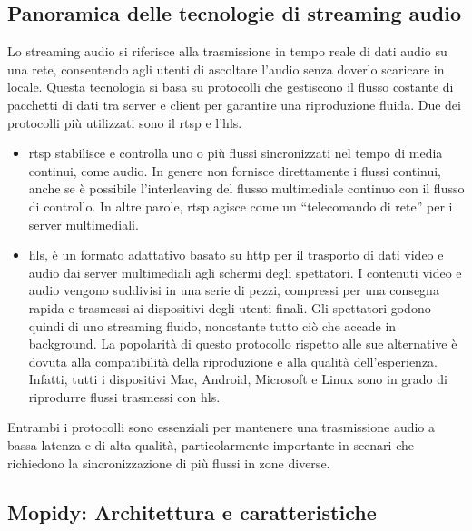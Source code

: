 \subsection{Panoramica delle tecnologie di streaming audio}
\noindent

Lo streaming audio si riferisce alla trasmissione in tempo reale di dati audio su una rete, consentendo agli utenti di ascoltare l'audio senza doverlo scaricare in locale. Questa tecnologia si basa su protocolli che gestiscono il flusso costante di pacchetti di dati tra server e client  per garantire una riproduzione fluida. Due dei protocolli più utilizzati sono il \gls{rtsp} e l'\gls{hls}.

\begin{itemize}
    \item \gls{rtsp} stabilisce e controlla uno o più flussi sincronizzati nel 
          tempo di media continui, come audio. In genere non fornisce 
          direttamente i flussi continui, anche se è possibile l'interleaving del 
          flusso multimediale continuo con il flusso di controllo. In altre parole, 
          \gls{rtsp} agisce come un ``telecomando di rete'' per i server 
          multimediali.
          
    \item \gls{hls}, è un formato adattativo basato su \gls{http} per il trasporto 
          di dati video e audio dai server multimediali agli schermi degli 
          spettatori. I contenuti video e audio vengono suddivisi in una serie di 
          pezzi, compressi per una consegna rapida e trasmessi ai dispositivi 
          degli utenti finali. Gli spettatori godono quindi di uno streaming fluido, 
          nonostante tutto ciò che accade in background. La popolarità di 
          questo protocollo rispetto alle sue alternative è dovuta alla 
          compatibilità della riproduzione e alla qualità dell'esperienza. Infatti, 
          tutti i dispositivi Mac, Android, Microsoft e Linux sono in grado di 
          riprodurre flussi trasmessi con \gls{hls}.
  \end{itemize}

Entrambi i protocolli sono essenziali per mantenere una trasmissione audio a bassa latenza e di alta qualità, particolarmente importante in scenari che richiedono la sincronizzazione di più flussi in zone diverse.

\subsection{Mopidy: Architettura e caratteristiche}
\noindent

